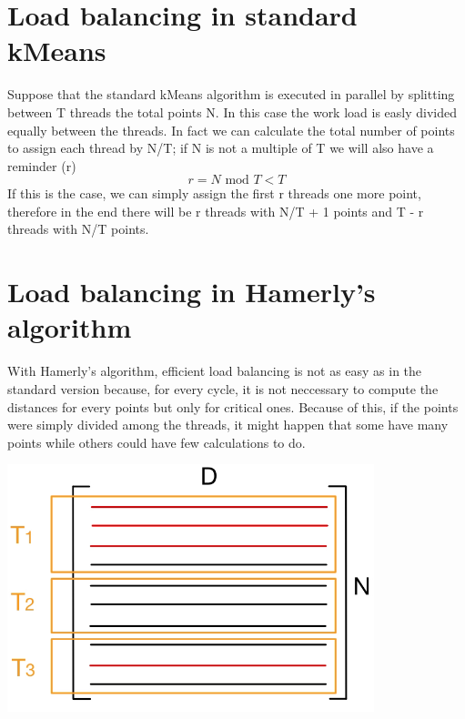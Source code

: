 \documentclass{report}
\begin{document}
  \begin{minipage}[b]{0.48\textwidth}
    \section*{Load balancing in standard kMeans}
    Suppose that the standard kMeans algorithm is executed in parallel by splitting between T threads the total points N. In this case the work load is easly divided equally between the threads. In fact we can calculate the total number of points to assign each thread by N/T; if N is not a multiple of T we will also have a reminder (r)
    \begin{equation}
      r = N \text{ mod } T < T
    \end{equation}
    If this is the case, we can simply assign the first r threads one more point, therefore in the end there will be r threads with N/T + 1 points and T - r threads with N/T points.

    \section*{Load balancing in Hamerly's algorithm}
    With Hamerly's algorithm, efficient load balancing is not as easy as in the standard version because, for every cycle, it is not neccessary to compute the distances for every points but only for critical ones. Because of this, if the points were simply divided among the threads, it might happen that some have many points while others could have few calculations to do.

    \begin{center}
      \includegraphics[width = 0.8\textwidth]{imgs/non_balances_hamerly.png}
      \label{fig:non_bal_ham}
    \end{center}


\end{minipage}
\end{document}
